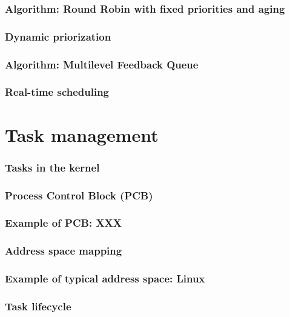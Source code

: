 
\begin{frame}
  \frametitle{Algorithm: Round Robin with fixed priorities and aging}
\end{frame}


\begin{frame}
  \frametitle{Dynamic priorization}
\end{frame}


\begin{frame}
  \frametitle{Algorithm: Multilevel Feedback Queue}
\end{frame}


\begin{frame}
  \frametitle{Real-time scheduling}
\end{frame}

%
%

\section{Task management}


\begin{frame}
  \frametitle{Tasks in the kernel}
\end{frame}


\begin{frame}
  \frametitle{Process Control Block (PCB)}
\end{frame}


\begin{frame}
  \frametitle{Example of PCB: XXX}
\end{frame}


\begin{frame}
  \frametitle{Address space mapping}
\end{frame}


\begin{frame}
  \frametitle{Example of typical address space: Linux}
\end{frame}


\begin{frame}
  \frametitle{Task lifecycle}
\end{frame}

